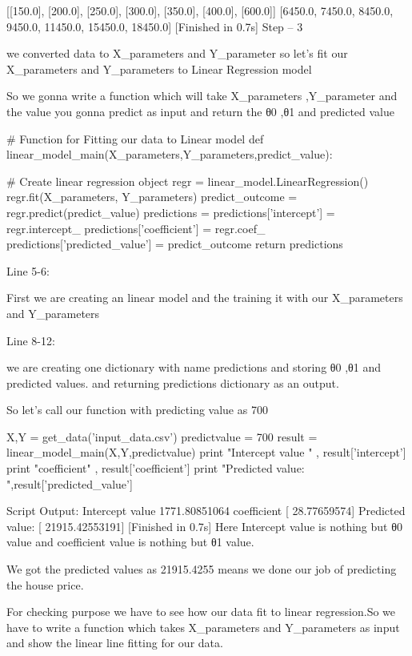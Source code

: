  [[150.0], [200.0], [250.0], [300.0], [350.0], [400.0], [600.0]]
[6450.0, 7450.0, 8450.0, 9450.0, 11450.0, 15450.0, 18450.0]
[Finished in 0.7s] 
Step – 3
 
we converted data to X\_parameters and Y\_parameter so let’s fit our X_parameters and Y_parameters to Linear Regression model
 
So we gonna write a function which will take  X\_parameters ,Y\_parameter and the value you gonna predict  as input and return the θ0 ,θ1  and predicted value
 
 
# Function for Fitting our data to Linear model
def linear_model_main(X_parameters,Y_parameters,predict_value):

 # Create linear regression object
 regr = linear_model.LinearRegression()
 regr.fit(X_parameters, Y_parameters)
 predict_outcome = regr.predict(predict_value)
 predictions = {}
 predictions['intercept'] = regr.intercept_
 predictions['coefficient'] = regr.coef_
 predictions['predicted_value'] = predict_outcome
 return predictions
 
Line 5-6:
 
First we are creating an linear model and the training it with our X_parameters and Y_parameters
 
Line 8-12:
 
we are creating one dictionary with name predictions and storing θ0 ,θ1  and predicted values. and returning predictions dictionary as an output.
 
So let’s call our function with predicting value as 700
 
X,Y = get_data('input_data.csv')
predictvalue = 700
result = linear_model_main(X,Y,predictvalue)
print "Intercept value " , result['intercept']
print "coefficient" , result['coefficient']
print "Predicted value: ",result['predicted_value']
 
 
Script Output:
 Intercept value 1771.80851064
coefficient [ 28.77659574]
Predicted value: [ 21915.42553191]
[Finished in 0.7s] 
Here Intercept value is nothing but   θ0 value and coefficient value is nothing but  θ1 value.
 
We got the predicted values as 21915.4255 means we done our job of predicting the house price.
 
For checking purpose we have to see how our data fit to linear regression.So we have to write a function which takes X_parameters and Y_parameters as input and show the linear line fitting for our data.
 
